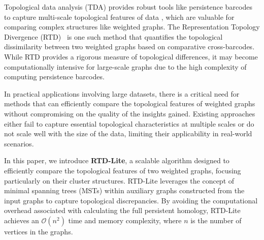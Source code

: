 \documentclass[twoside]{article}
\begin{document}
Topological data analysis (TDA) provides robust tools like persistence barcodes to capture multi-scale topological features of data \citep{barannikov1994framed,zomorodian2001computing,chazal2021introduction}, which are valuable for comparing complex structures like weighted graphs. The Representation Topology Divergence (RTD)~\cite{barannikov2021representation} is one such method that quantifies the topological dissimilarity between two weighted graphs based on comparative cross-barcodes. While RTD provides a rigorous measure of topological differences, it may  become computationally intensive for large-scale graphs due to the high complexity of computing persistence barcodes.

In practical applications involving large datasets, there is a critical need for methods that can efficiently compare the topological features of weighted graphs without compromising on the quality of the insights gained. Existing approaches either fail to capture essential topological characteristics at multiple scales or do not scale well with the size of the data, limiting their applicability in real-world scenarios.

In this paper, we introduce \textbf{RTD-Lite}, a scalable algorithm designed to efficiently compare the topological features of two weighted graphs, focusing particularly on their cluster structures. RTD-Lite leverages the concept of minimal spanning trees (MSTs) within auxiliary graphs constructed from the input graphs to capture topological discrepancies. By avoiding the computational overhead associated with calculating the full persistent homology, RTD-Lite achieves an \(\mathcal{O}(n^2)\) time and memory complexity, where \(n\) is the number of vertices in the graphs.
\end{document}

